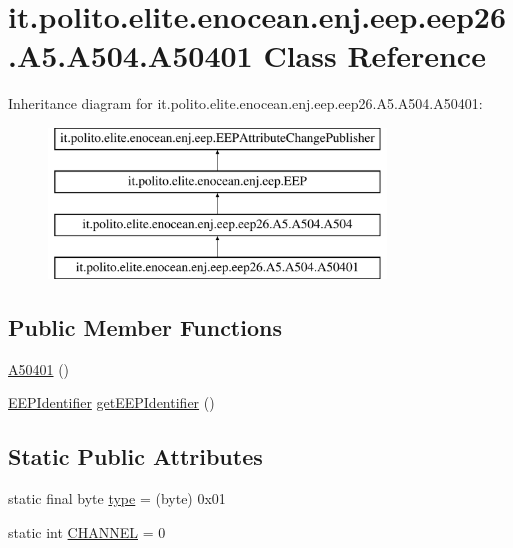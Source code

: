 \hypertarget{classit_1_1polito_1_1elite_1_1enocean_1_1enj_1_1eep_1_1eep26_1_1_a5_1_1_a504_1_1_a50401}{}\section{it.\+polito.\+elite.\+enocean.\+enj.\+eep.\+eep26.\+A5.\+A504.\+A50401 Class Reference}
\label{classit_1_1polito_1_1elite_1_1enocean_1_1enj_1_1eep_1_1eep26_1_1_a5_1_1_a504_1_1_a50401}
Inheritance diagram for it.\+polito.\+elite.\+enocean.\+enj.\+eep.\+eep26.\+A5.\+A504.\+A50401\+:\begin{figure}[H]
\begin{center}
\leavevmode
\includegraphics[height=4.000000cm]{classit_1_1polito_1_1elite_1_1enocean_1_1enj_1_1eep_1_1eep26_1_1_a5_1_1_a504_1_1_a50401}
\end{center}
\end{figure}
\subsection*{Public Member Functions}
\begin{DoxyCompactItemize}
\item 
\hyperlink{classit_1_1polito_1_1elite_1_1enocean_1_1enj_1_1eep_1_1eep26_1_1_a5_1_1_a504_1_1_a50401_a90731c1fda69e8108e83b2734fe495c0}{A50401} ()
\item 
\hyperlink{classit_1_1polito_1_1elite_1_1enocean_1_1enj_1_1eep_1_1_e_e_p_identifier}{E\+E\+P\+Identifier} \hyperlink{classit_1_1polito_1_1elite_1_1enocean_1_1enj_1_1eep_1_1eep26_1_1_a5_1_1_a504_1_1_a50401_a60aa75e2b9962bcb3385eafb1e94e740}{get\+E\+E\+P\+Identifier} ()
\end{DoxyCompactItemize}
\subsection*{Static Public Attributes}
\begin{DoxyCompactItemize}
\item 
static final byte \hyperlink{classit_1_1polito_1_1elite_1_1enocean_1_1enj_1_1eep_1_1eep26_1_1_a5_1_1_a504_1_1_a50401_a63daa6f785304f331a8f989fed42c817}{type} = (byte) 0x01
\item 
static int \hyperlink{classit_1_1polito_1_1elite_1_1enocean_1_1enj_1_1eep_1_1eep26_1_1_a5_1_1_a504_1_1_a50401_addfa8585c3fc1044192de82a815aa1fa}{C\+H\+A\+N\+N\+EL} = 0
\end{DoxyCompactItemize}
